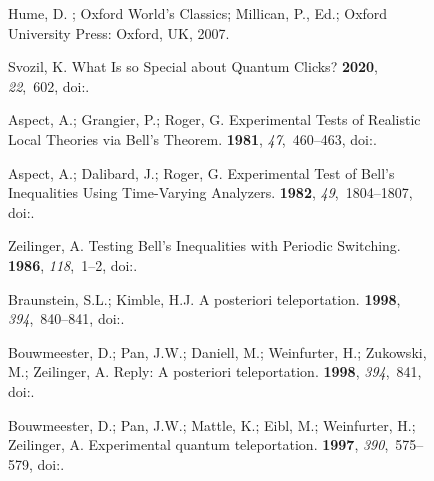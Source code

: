 \documentclass[entropy,article,accept,oneauthor,pdftex]{Definitions/mdpi}
\begin{document}
\begin{figure}[H]
\begin{thebibliography}{999}
Hume, D.
; {O}xford World's Classics; Millican, P., Ed.; Oxford University Press: Oxford, UK, 2007.%

Svozil, K.
\newblock What Is so Special about Quantum Clicks?
 {\bf 2020}, {\em 22},~602, doi:{\href{https://doi.org/10.3390/e22060602}{}}.

Aspect, A.; Grangier, P.; Roger, G.
\newblock Experimental Tests of Realistic Local Theories via {B}ell's Theorem.
 {\bf 1981}, {\em 47},~460--463, doi:{\href{https://doi.org/10.1103/PhysRevLett.47.460}{}}.

Aspect, A.; Dalibard, J.; Roger, G.
\newblock Experimental Test of {B}ell's Inequalities Using Time-Varying
  Analyzers.
 {\bf 1982}, {\em 49},~1804--1807, doi:{\href{https://doi.org/10.1103/PhysRevLett.49.1804}{}}.

Zeilinger, A.
\newblock Testing {B}ell's Inequalities with Periodic Switching.
 {\bf 1986}, {\em 118},~1--2, doi:{\href{https://doi.org/10.1016/0375-9601(86)90520-7}{}}.

Braunstein, S.L.; Kimble, H.J.
\newblock A posteriori teleportation.
 {\bf 1998}, {\em 394},~840--841, doi:{\href{https://doi.org/10.1038/29674}{}}.

Bouwmeester, D.; Pan, J.W.; Daniell, M.; Weinfurter, H.; Zukowski, M.;
  Zeilinger, A.
\newblock Reply: {A} posteriori teleportation.
 {\bf 1998}, {\em 394},~841, doi:{\href{https://doi.org/10.1038/29678}{}}.

Bouwmeester, D.; Pan, J.W.; Mattle, K.; Eibl, M.; Weinfurter, H.; Zeilinger, A.
\newblock Experimental quantum teleportation.
 {\bf 1997}, {\em 390},~575--579, doi:{\href{https://doi.org/10.1038/37539}{}}.


\end{thebibliography}
\end{figure}
\end{document}
